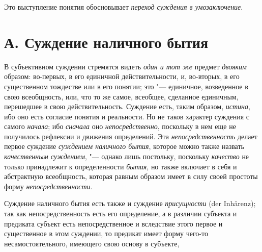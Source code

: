 {Это выступление понятия обосновывает
{\em переход суждения в
умозаключение}.

\section[А. Суждение наличного бытия]{А. Суждение наличного бытия}
В субъективном суждении стремятся видеть
{\em один и тот же}
предмет {\em двояким}
образом: во-первых, в его единичной действительности, и,
во-вторых, в его существенном тождестве или в его понятии; это
"--- единичное, возведенное в свою всеобщность, или, что то же
самое, всеобщее, сделанное единичным, перешедшее в свою действительность.
Суждение есть, таким образом,
{\em истина}, ибо оно
есть согласие понятия и реальности. Но не таков характер суждения с самого
{\em начала}; ибо
{\em сначала} оно
{\em непосредственно},
поскольку в нем еще не получилось рефлексии и движения
определений. Эта
{\em непосредственность}
делает первое суждение
{\em суждением наличного бытия},
которое можно также назвать
{\em качественным суждением}, "---
однако лишь постольку, поскольку
{\em качество} не только
принадлежит к определенности
{\em бытия}, но также
включает в себя и абстрактную всеобщность, которая равным образом имеет в
силу своей простоты форму
{\em непосредственности}.

Суждение наличного бытия есть также и суждение
{\em присущности} (der Inhärenz);
так как непосредственность есть его определение, а в различии
субъекта и предиката субъект есть непосредственное и
вследствие этого первое и существенное в этом суждении, то
предикат имеет форму чего-то несамостоятельного, имеющего свою основу в
субъекте,

}
